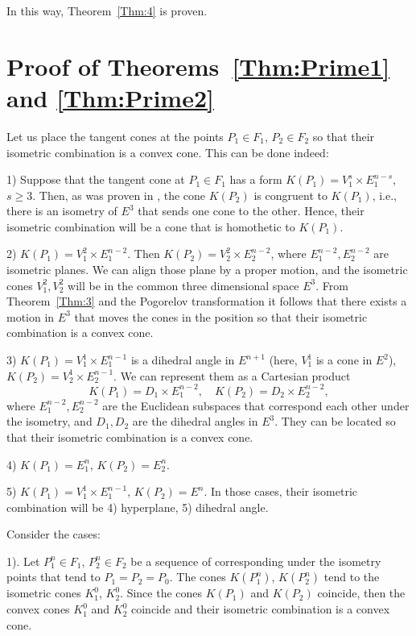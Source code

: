 \documentclass[11pt,oneside]{amsart}
\theoremstyle{theorem}
\theoremstyle{definition}
\theoremstyle{remark}
\begin{document}
In this way, Theorem~\ref{Thm:4} is proven.  


\section{Proof of Theorems~\ref{Thm:Prime1} and \ref{Thm:Prime2}}


Let us place the tangent cones at the points $P_1 \in F_1$, $P_2 \in F_2$ so that their isometric combination is a convex cone. This can be done indeed:

1) Suppose that the tangent cone at $P_1 \in F_1$ has a form $K(P_1) = V_1^s \times E_1^{n-s}$, $s \ge 3$. Then, as was proven in \cite{Bor}, the cone $K(P_2)$ is congruent to $K(P_1)$, i.e., there is an isometry of $E^3$ that sends one cone to the other. Hence, their isometric combination will be a cone that is homothetic to $K(P_1)$. 

2) $K(P_1) = V_1^2 \times E_1^{n-2}$. Then $K(P_2) = V_2^2 \times E_2^{n-2}$, where $E_1^{n-2}, E_2^{n-2}$ are isometric planes. We can align those plane by a proper motion, and the isometric cones $V_1^2, V_2^2$ will be in the common three dimensional space $E^3$. From Theorem~\ref{Thm:3} and the Pogorelov transformation it follows that there exists a motion in $E^3$ that moves the cones in the position so that their isometric combination is a convex cone.

3) $K(P_1) = V_1^1 \times E_1^{n-1}$ is a dihedral angle in $E^{n+1}$ (here, $V_1^1$ is a cone in $E^2$), $K(P_2) = V_2^1 \times E_2^{n-1}$. We can represent them as a Cartesian product 
\[
K(P_1) = D_1 \times E_1^{n-2}, \quad K(P_2) = D_2 \times E_2^{n-2},
\]
where $E_1^{n-2}, E_2^{n-2}$ are the Euclidean subspaces that correspond each other under the isometry, and $D_1, D_2$ are the dihedral angles in $E^3$. They can be located so that their isometric combination is a convex cone.

4) $K(P_1) = E_1^n$, $K(P_2) = E_2^n$.

5) $K(P_1) = V_1^1 \times E_1^{n-1}$, $K(P_2) = E^n$. In those cases, their isometric combination will be 4) hyperplane, 5) dihedral angle.

Consider the cases:

1). Let $P_1^n \in F_1$, $P_2^n \in F_2$ be a sequence of corresponding under the isometry points that tend to $P_1 = P_2 = P_0$. The cones $K(P_1^n)$, $K(P_2^n)$ tend to the isometric cones $K_1^0$, $K_2^0$. Since the cones $K(P_1)$ and $K(P_2)$ coincide, then the convex cones $K_1^0$ and $K_2^0$ coincide and their isometric combination is a convex cone. 
\end{document}
